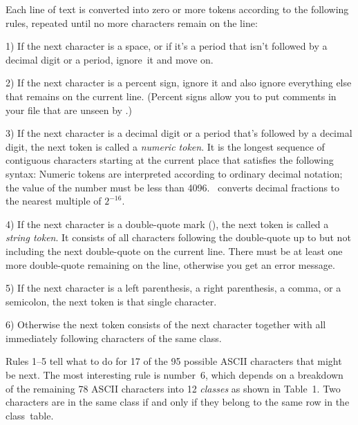 Each line of text is converted into zero or more tokens according to the
following rules, repeated until no more characters remain on the line:

\smallskip
\item{1)} If the next character is a space, or if it's a period that isn't
followed by a decimal digit or a period, ignore~it and move on.

\item{2)} If the next character is a percent sign, ignore it and also
ignore everything else that remains on the current line. (Percent signs
allow you to put comments in your file that are unseen by \MF.)

\item{3)} If the next character is a decimal digit or a period that's
followed by a decimal digit, the next token is called a {\it numeric
token}. It is the longest sequence of contiguous characters starting
at the current place that satisfies the following syntax:
Numeric tokens are interpreted according to ordinary decimal notation;
the value of the number must be less than 4096. \MF\ converts decimal
fractions to the nearest multiple of $2^{-16}$.

\item{4)} If the next character is a double-quote mark
(\thinspace), the next token is called a {\it string
token}. It consists of all characters following the double-quote up to
but not including the next double-quote on the current line. There must be
at least one more double-quote remaining on the line, otherwise you
get an error message.

\item{5)} If the next character is a left parenthesis, a right parenthesis,
a comma, or a semicolon, the next token is that single character.

\item{6)} Otherwise the next token consists of the next character together
with all immediately following characters of the same class.

\smallskip\noindent
Rules 1--5 tell what to do for 17 of the 95 possible ASCII characters
that might be next. The most interesting rule is number~6, which depends
on a breakdown of the remaining 78 ASCII characters into 12 {\it
classes\/} as shown in Table~1.  Two characters are in the same class if
and only if they belong to the same row in the class~table.

